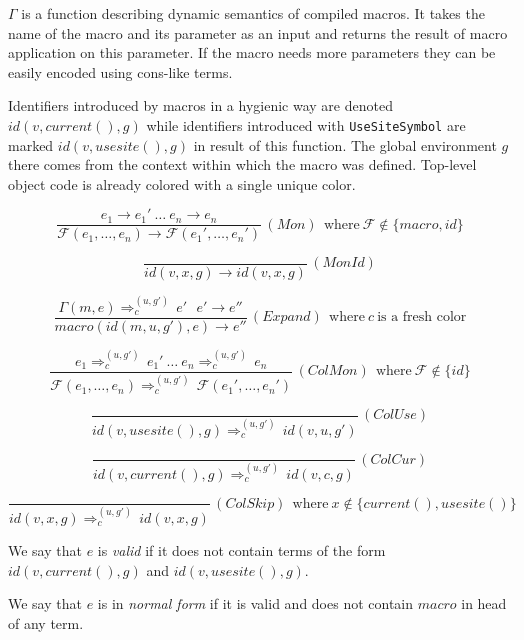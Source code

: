 \documentclass{llncs}
\newcommand{\infrule}[3]{
  \displaystyle
  \frac{#1}{#2}
  \, #3
}
\newcommand{\nf}[2]{#1 \rightarrow #2}
\newcommand{\colr}[2]{#1 \Rightarrow^{(u, g')}_{c} \, #2}
\begin{document}
$\Gamma$ is a function describing dynamic semantics of compiled macros.
It takes the name of the macro and its parameter as an input and returns the result of
macro application on this parameter. If the macro needs more parameters they
can be easily encoded using cons-like terms.

Identifiers introduced by macros in a hygienic way are denoted
$id(v,current(),g)$ while identifiers introduced with \verb,UseSiteSymbol,
are marked $id(v,usesite(),g)$ in result of this function. The
global environment $g$ there comes from the context within which the macro
was defined. Top-level object code is already colored with a single
unique color.


$$
  \infrule{
    \nf{e_1}{e_1'} \ \ldots\ \nf{e_n}{e_n}
  }{
    \nf{
      \mathcal{F}(e_1, \ldots, e_n)
    }{
      \mathcal{F}(e_1', \ldots, e_n')
    }
  }{(Mon) \ \ \textrm{where}\ \mathcal{F} \notin \{ macro, id \}}
$$

$$
  \infrule{
  }{
    \nf{
      id (v, x, g)
    }{
      id (v, x, g)
    }
  }{(MonId)}
$$

$$
  \infrule{
    \colr{\Gamma(m,e)}{e'} \ \ \ \nf{e'}{e''}
  }{
    \nf{
      macro (id(m, u, g'), e)
    }{
      e''
    }
  }{(Expand) \ \ \textrm{where}\ c \ \textrm{is\ a\ fresh\ color}}
$$

$$
  \infrule{
    \colr{e_1}{e_1'} \ \ldots\ \colr{e_n}{e_n}
  }{
    \colr{
      \mathcal{F}(e_1, \ldots, e_n)
    }{
      \mathcal{F}(e_1', \ldots, e_n')
    }
  }{(ColMon)\ \ \textrm{where}\ \mathcal{F} \notin \{ id \}}
$$

$$
  \infrule{
  }{
    \colr{
      id (v, usesite (), g)
    }{
      id (v, u, g')
    }
  }{(ColUse)}
$$

$$
  \infrule{
  }{
    \colr{
      id (v, current (), g)
    }{
      id (v, c, g)
    }
  }{(ColCur)}
$$

$$
  \infrule{
  }{
    \colr{
      id (v, x, g)
    }{
      id (v, x, g)
    }
  }{(ColSkip)\ \ \textrm{where}\ x \notin \{ current (), usesite () \}}
$$

\begin{definition}
We say that $e$ is \emph{valid} if it does not
contain terms of the form $id(v, current(), g)$ and $id(v, usesite(), g)$.
\end{definition}

\begin{definition}
We say that $e$ is in \emph{normal form} if it is
valid and does not contain $macro$ in head of any term.
\end{definition}
\end{document}
